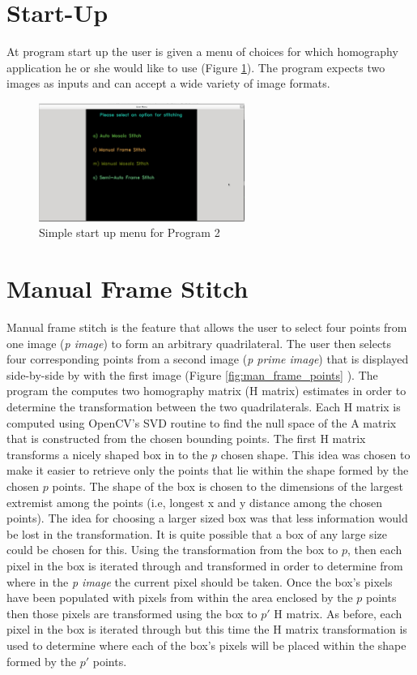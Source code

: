 \documentclass[10pt,twocolumn,letterpaper]{article}
\begin{document}
\section{Start-Up}

At program start up the user is given a menu of choices for which homography application he or she would like to use (Figure \ref{fig:menu}). The program expects two images as inputs and can accept a wide variety of image formats.

\begin{figure}[ht!]
\centering
\includegraphics[width=0.6\textwidth]{img/prog_2_menu.eps}
\caption{Simple start up menu for Program 2}
\label{fig:menu}
\end{figure}

\section{ Manual Frame Stitch }
Manual frame stitch is the feature that allows the user to select four points from one image (\emph{p image}) to form an arbitrary quadrilateral. The user then selects four corresponding points from a second image (\emph{p prime image}) that is displayed side-by-side by with the first image (Figure \ref{fig:man_frame_points} ). The program the computes two homography matrix (H matrix) estimates in order to determine the transformation between the two quadrilaterals. Each H matrix is computed using OpenCV's SVD routine to find the null space of the A matrix that is constructed from the chosen bounding points. The first H matrix transforms a nicely shaped box in to the $p$ chosen shape. This idea was chosen to make it easier to retrieve only the points that lie within the shape formed by the chosen $p$ points. The shape of the box is chosen to the dimensions of the largest extremist among the points (i.e, longest x and y distance among the chosen points). The idea for choosing a larger sized box was that less information would be lost in the transformation. It is quite possible that a box of any large size could be chosen for this. Using the transformation from the box to $p$, then each pixel in the box is iterated through and transformed in order to determine from where in the \emph{p image} the current pixel should be taken. Once the box's pixels have been populated with pixels from within the area enclosed by the $p$ points then those pixels are transformed using the box to $p'$ H matrix. As before, each pixel in the box is iterated through but this time the H matrix transformation is used to determine where each of the box's pixels will be placed within the shape formed by the $p'$ points.
\end{document}
